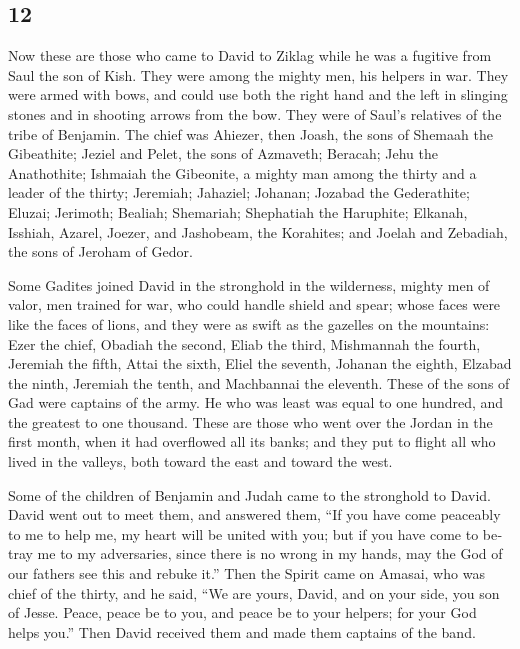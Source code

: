 \begin{paracol}{2}
\begin{otherlanguage}{english}
\hypertarget{section-23}{%
\section{12}\label{section-23}}

 Now these are those who came to David to Ziklag while he
was a fugitive from Saul the son of Kish. They were among the mighty
men, his helpers in war.  They were armed with bows, and
could use both the right hand and the left in slinging stones and in
shooting arrows from the bow. They were of Saul's relatives of the tribe
of Benjamin.  The chief was Ahiezer, then Joash, the sons
of Shemaah the Gibeathite; Jeziel and Pelet, the sons of Azmaveth;
Beracah; Jehu the Anathothite;  Ishmaiah the Gibeonite, a
mighty man among the thirty and a leader of the thirty; Jeremiah;
Jahaziel; Johanan; Jozabad the Gederathite;  Eluzai;
Jerimoth; Bealiah; Shemariah; Shephatiah the Haruphite; 
Elkanah, Isshiah, Azarel, Joezer, and Jashobeam, the Korahites;
 and Joelah and Zebadiah, the sons of Jeroham of Gedor.

 Some Gadites joined David in the stronghold in the
wilderness, mighty men of valor, men trained for war, who could handle
shield and spear; whose faces were like the faces of lions, and they
were as swift as the gazelles on the mountains:  Ezer the
chief, Obadiah the second, Eliab the third,  Mishmannah
the fourth, Jeremiah the fifth,  Attai the sixth, Eliel
the seventh,  Johanan the eighth, Elzabad the ninth,
 Jeremiah the tenth, and Machbannai the eleventh.
 These of the sons of Gad were captains of the army. He
who was least was equal to one hundred, and the greatest to one
thousand.  These are those who went over the Jordan in
the first month, when it had overflowed all its banks; and they put to
flight all who lived in the valleys, both toward the east and toward the
west.

 Some of the children of Benjamin and Judah came to the
stronghold to David.  David went out to meet them, and
answered them, ``If you have come peaceably to me to help me, my heart
will be united with you; but if you have come to betray me to my
adversaries, since there is no wrong in my hands, may the God of our
fathers see this and rebuke it.''  Then the Spirit came
on Amasai, who was chief of the thirty, and he said, ``We are yours,
David, and on your side, you son of Jesse. Peace, peace be to you, and
peace be to your helpers; for your God helps you.'' Then David received
them and made them captains of the band.


\end{otherlanguage}
\end{paracol}
